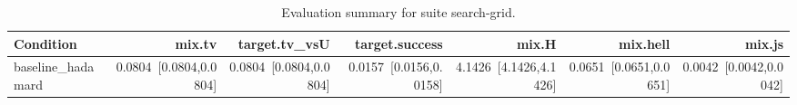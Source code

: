 \begin{table}[t]
\centering
\caption{Evaluation summary for suite search-grid.}
\label{tab:eval_search-grid}
\begin{tabular}{lrrrrrr}
\toprule
Condition & mix.tv & target.tv\_vsU & target.success & mix.H & mix.hell & mix.js \\
\midrule
baseline\_hadamard & 0.0804~[0.0804,0.0804] & 0.0804~[0.0804,0.0804] & 0.0157~[0.0156,0.0158] & 4.1426~[4.1426,4.1426] & 0.0651~[0.0651,0.0651] & 0.0042~[0.0042,0.0042] \\
\bottomrule
\end{tabular}
\end{table}
